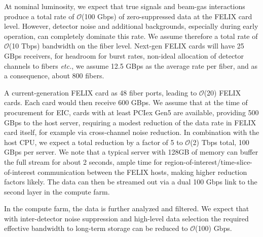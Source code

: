 At nominal luminosity, we expect that true signals and beam-gas interactions produce a total rate of $\mathcal{O}$(100 Gbps) of zero-suppressed data at the FELIX card level. However, detector noise and additional backgrounds, especially during early operation, can completely dominate this rate. We assume therefore a total rate of $\mathcal{O}$(10 Tbps) bandwidth on the fiber level. Next-gen FELIX cards will have 25 GBps receivers, for headroom for burst rates, non-ideal allocation of detector channels to fibers \emph{etc.}, we assume 12.5 GBps as the average rate per fiber, and as a consequence, about 800 fibers.

A current-generation FELIX card as 48 fiber ports, leading to $\mathcal{O}$(20) FELIX cards. Each card would then receive 600 GBps. We assume that at the time of procurement for EIC, cards with at least PCIex Gen5 are available, providing 500 GBps to the host server, requiring a modest reduction of the data rate in FELIX card itself, for example via cross-channel noise reduction. In combination with the host CPU, we expect a total reduction by a factor of 5 to $\mathcal{O}$(2) Tbps total, 100 GBps per server. We note that a typical server with 128GB of memory can buffer the full stream for about 2 seconds, ample time for region-of-interest/time-slice-of-interest communication between the FELIX hosts, making higher reduction factors likely. The data can then be streamed out via a dual 100 Gbps link to the second layer in the compute farm.

In the compute farm, the data is further analyzed and filtered. We expect that with inter-detector noise suppression and high-level data selection the required effective bandwidth to long-term storage can be reduced to $\mathcal{O}$(100) Gbps.  






